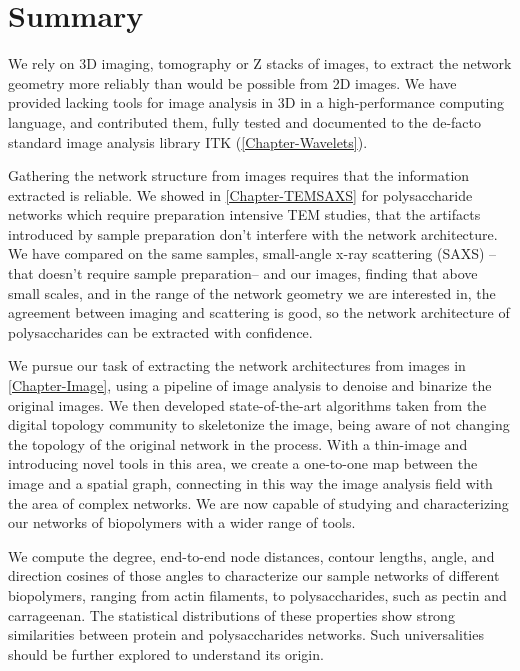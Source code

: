 \section{Summary}%
\label{sec:conclusions_summary}

We rely on 3D imaging, tomography or Z stacks of images, to extract the network geometry more reliably than would be possible from 2D images. We have provided lacking tools for image analysis in 3D in a high-performance computing language, and contributed them, fully tested and documented to the de-facto standard image analysis library ITK (\autoref{Chapter-Wavelets}).

Gathering the network structure from images requires that the information extracted is reliable. We showed in \autoref{Chapter-TEMSAXS} for polysaccharide networks which require preparation intensive TEM studies, that the artifacts introduced by sample preparation don't interfere with the network architecture. We have compared on the same samples, small-angle x-ray scattering (SAXS) --that doesn't require sample preparation-- and our images, finding that above small scales, and in the range of the network geometry we are interested in, the agreement between imaging and scattering is good, so the network architecture of polysaccharides can be extracted with confidence.

We pursue our task of extracting the network architectures from images in \autoref{Chapter-Image}, using a pipeline of image analysis to denoise and binarize the original images. We then developed state-of-the-art algorithms taken from the digital topology community to skeletonize the image, being aware of not changing the topology of the original network in the process. With a thin-image and introducing novel tools in this area, we create a one-to-one map between the image and a spatial graph, connecting in this way the image analysis field with the area of complex networks. We are now capable of studying and characterizing our networks of biopolymers with a wider range of tools.

We compute the degree, end-to-end node distances, contour lengths, angle, and direction cosines of those angles to characterize our sample networks of different biopolymers, ranging from actin filaments, to polysaccharides, such as pectin and carrageenan. The statistical distributions of these properties show strong similarities between protein and polysaccharides networks. Such universalities should be further explored to understand its origin.

